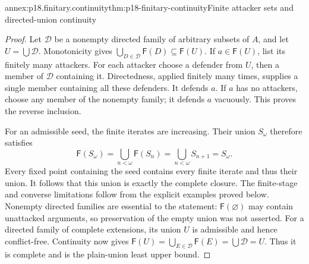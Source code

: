 \begin{annexitem}{annex:p18.finitary.continuity}{thm:p18-finitary-continuity}{Finite attacker sets and directed-union continuity}
\begin{proof}
Let \(\mathcal D\) be a nonempty
directed family of arbitrary subsets
of \(A\), and let \(U=\bigcup\mathcal D\).
Monotonicity gives
\(\bigcup_{D\in\mathcal D}\mathsf F(D)
 \subseteq\mathsf F(U)\).
If \(a\in\mathsf F(U)\), list its
finitely many attackers. For each
attacker choose a defender from
\(U\), then a member of
\(\mathcal D\) containing it.
Directedness, applied finitely
many times, supplies a single
member containing all these
defenders. It defends \(a\).
If \(a\) has no attackers,
choose any member of the
nonempty family; it defends
\(a\) vacuously. This proves
the reverse inclusion.

For an admissible seed,
the finite iterates are
increasing. Their union
\(S_\omega\) therefore satisfies
\[
 \mathsf F(S_\omega)
   =\bigcup_{n<\omega}\mathsf F(S_n)
   =\bigcup_{n<\omega}S_{n+1}
   =S_\omega.
\]
Every fixed point containing
the seed contains every finite
iterate and thus their union.
It follows that this union
is exactly the complete closure.
The finite-stage and converse
limitations follow from the
explicit examples proved below.
Nonempty directed families
are essential to the statement:
\(\mathsf F(\varnothing)\)
may contain unattacked arguments,
so preservation of the
empty union was not asserted.
For a directed family of complete
extensions, its union \(U\)
is admissible and hence
conflict-free. Continuity
now gives
\(\mathsf F(U)=\bigcup_{E\in\mathcal D}\mathsf F(E)
             =\bigcup\mathcal D=U\).
Thus it is complete
and is the plain-union
least upper bound.
\end{proof}
\end{annexitem}

